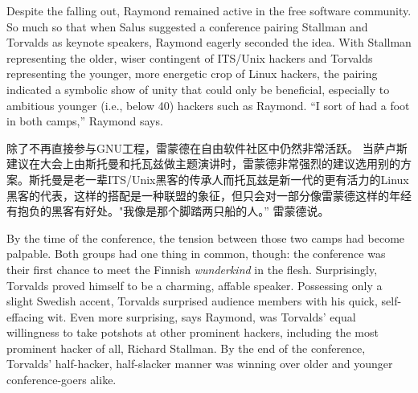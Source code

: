 \ifdefined\eng
Despite the falling out, Raymond remained active in the free software community. So much so that when Salus suggested a conference pairing Stallman and Torvalds as keynote speakers, Raymond eagerly seconded the idea. With Stallman representing the older, wiser contingent of ITS/Unix hackers and Torvalds representing the younger, more energetic crop of Linux hackers, the pairing indicated a symbolic show of unity that could only be beneficial, especially to ambitious younger (i.e., below 40) hackers such as Raymond. ``I sort of had a foot in both camps,'' Raymond says.
\fi

\ifdefined\chs
除了不再直接参与GNU工程，雷蒙德在自由软件社区中仍然非常活跃。 当萨卢斯建议在大会上由斯托曼和托瓦兹做主题演讲时，雷蒙德非常强烈的建议选用别的方案。斯托曼是老一辈ITS/Unix黑客的传承人而托瓦兹是新一代的更有活力的Linux黑客的代表，这样的搭配是一种联盟的象征，但只会对一部分像雷蒙德这样的年经有抱负的黑客有好处。"我像是那个脚踏两只船的人。'' 雷蒙德说。
\fi

\ifdefined\eng
By the time of the conference, the tension between those two camps had become palpable. Both groups had one thing in common, though: the conference was their first chance to meet the Finnish \textit{wunderkind} in the flesh. Surprisingly, Torvalds proved himself to be a charming, affable speaker. Possessing only a slight Swedish accent, Torvalds surprised audience members with his quick, self-effacing wit. Even more surprising, says Raymond, was Torvalds' equal willingness to take potshots at other prominent hackers, including the most prominent hacker of all, Richard Stallman. By the end of the conference, Torvalds' half-hacker, half-slacker manner was winning over older and younger conference-goers alike.
\fi

